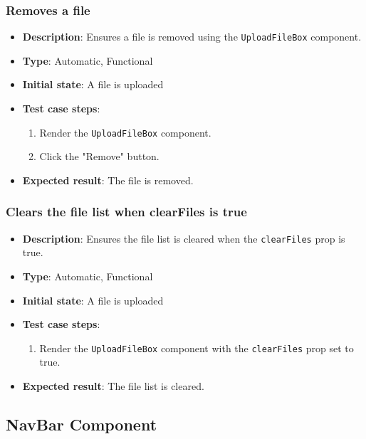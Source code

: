 \documentclass[12pt, titlepage]{article}
\begin{document}
\subsubsection{Removes a file}
\begin{itemize}
    \item \textbf{Description}: Ensures a file is removed using the \texttt{UploadFileBox} component.
    \item \textbf{Type}: Automatic, Functional
    \item \textbf{Initial state}: A file is uploaded
    \item \textbf{Test case steps}:
    \begin{enumerate}
        \item Render the \texttt{UploadFileBox} component.
        \item Click the "Remove" button.
    \end{enumerate}
    \item \textbf{Expected result}: The file is removed.
\end{itemize}

\subsubsection{Clears the file list when clearFiles is true}
\begin{itemize}
    \item \textbf{Description}: Ensures the file list is cleared when the \texttt{clearFiles} prop is true.
    \item \textbf{Type}: Automatic, Functional
    \item \textbf{Initial state}: A file is uploaded
    \item \textbf{Test case steps}:
    \begin{enumerate}
        \item Render the \texttt{UploadFileBox} component with the \texttt{clearFiles} prop set to true.
    \end{enumerate}
    \item \textbf{Expected result}: The file list is cleared.
\end{itemize}

\subsection{NavBar Component}
\end{document}
